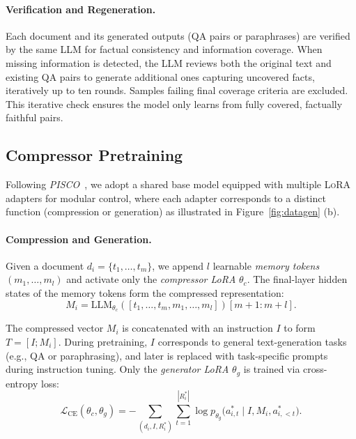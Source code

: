 \documentclass{applemlr}
\numberwithin{equation}{section}
\begin{document}
\paragraph{Verification and Regeneration.}
Each document and its generated outputs (QA pairs or paraphrases) are verified by the same LLM for factual consistency and information coverage.  
When missing information is detected, the LLM reviews both the original text and existing QA pairs to generate additional ones capturing uncovered facts, iteratively up to ten rounds.  
Samples failing final coverage criteria are excluded. This iterative check ensures the model only learns from fully covered, factually faithful pairs.



\subsection{Compressor Pretraining}
\label{sec:scp}

Following  \textit{PISCO}~\citep{louis-etal-2025-pisco}, we adopt a shared base model equipped with multiple \textsc{LoRA} adapters for modular control, where each adapter corresponds to a distinct function (compression or generation) as illustrated in Figure~\ref{fig:datagen} (b).

\paragraph{Compression and Generation.}
Given a document $d_i = \{t_1,\dots,t_m\}$, we append $l$ learnable \textit{memory tokens} $(m_1,\dots,m_l)$ and activate only the \textit{compressor LoRA} $\theta_c$. 
The final-layer hidden states of the memory tokens form the compressed representation:
\[
M_i = \mathrm{LLM}_{\theta_c}([t_1,\dots,t_m,m_1,\dots,m_l])[m{+}1:m{+}l].
\]

The compressed vector $M_i$ is concatenated with an instruction $I$ to form $T = [I; M_i]$. 
During pretraining, $I$ corresponds to general text-generation tasks (e.g., QA or paraphrasing), and later is replaced with task-specific prompts during instruction tuning. 
Only the \textit{generator LoRA} $\theta_g$ is trained via cross-entropy loss:
\begin{equation}
\mathcal{L}_{\text{CE}}(\theta_c,\theta_g)
= - \sum_{(d_i,I,R_i^*)} \sum_{t=1}^{|R_i^*|}
\log p_{\theta_g}\!\big(a_{i,t}^* \mid I,M_i,a_{i,<t}^*\big).
\label{eq:ce_loss}
\end{equation}
\end{document}
